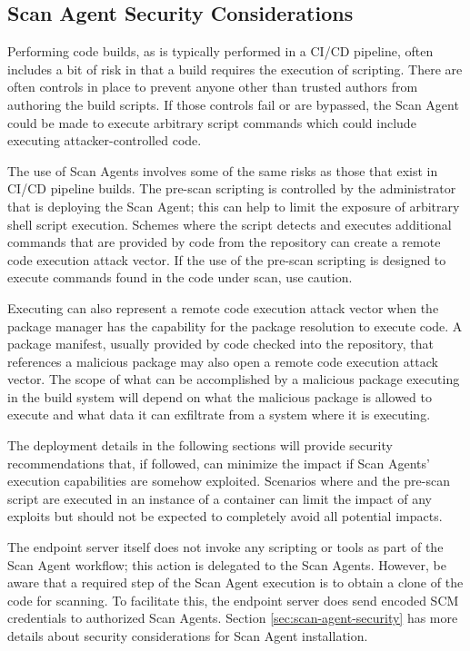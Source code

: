 \subsection{Scan Agent Security Considerations}\label{sec:scan-agent-security-considerations}

Performing code builds, as is typically performed in a CI/CD pipeline, often includes
a bit of risk in that a build requires the execution of scripting.  There are often
controls in place to prevent anyone other than trusted authors from authoring the build scripts.
If those controls fail or are bypassed, the Scan Agent could be made to execute arbitrary
script commands which could include executing attacker-controlled code.

The use of Scan Agents involves some of the same risks as those that exist in
CI/CD pipeline builds.  The pre-scan scripting is controlled by the
administrator that is deploying the Scan Agent; this can help to limit the exposure
of arbitrary shell script execution.  Schemes where the script detects and executes
additional commands that are provided by code from the repository can create
a remote code execution attack vector.  If the use of the pre-scan scripting is designed
to execute commands found in the code under scan, use caution.

Executing \scaresolver can also represent a remote code execution attack vector when the package manager has
the capability for the package resolution to execute code.  A package manifest,
usually provided by code checked into the repository, that references a malicious package may also
open a remote code execution attack vector.  The scope of what can be accomplished by a malicious package
executing in the build system will depend on what the malicious package is allowed to execute and what data
it can exfiltrate from a system where it is executing.

The deployment details in the following sections will provide security recommendations
that, if followed, can minimize the impact if Scan Agents' execution
capabilities are somehow exploited.  Scenarios where \scaresolver and the pre-scan script are executed in
an instance of a container can limit the impact of any exploits but should not be expected
to completely avoid all potential impacts. 

The \cxoneflow endpoint server itself does not invoke any scripting or tools as part of the 
Scan Agent workflow; this action is delegated to the Scan Agents.  However, be aware that a required step of the
Scan Agent execution is to obtain a clone of the code for scanning.  To facilitate this,
the \cxoneflow endpoint server does send encoded SCM credentials to authorized
Scan Agents.  Section \ref{sec:scan-agent-security} has more details
about security considerations for Scan Agent installation.

